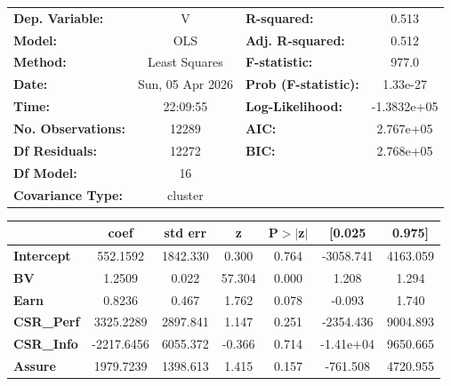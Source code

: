\begin{center}
\begin{tabular}{lclc}
\toprule
\textbf{Dep. Variable:}    &        V         & \textbf{  R-squared:         } &       0.513     \\
\textbf{Model:}            &       OLS        & \textbf{  Adj. R-squared:    } &       0.512     \\
\textbf{Method:}           &  Least Squares   & \textbf{  F-statistic:       } &       977.0     \\
\textbf{Date:}             & Sun, 05 Apr 2026 & \textbf{  Prob (F-statistic):} &    1.33e-27     \\
\textbf{Time:}             &     22:09:55     & \textbf{  Log-Likelihood:    } &  -1.3832e+05    \\
\textbf{No. Observations:} &       12289      & \textbf{  AIC:               } &   2.767e+05     \\
\textbf{Df Residuals:}     &       12272      & \textbf{  BIC:               } &   2.768e+05     \\
\textbf{Df Model:}         &          16      & \textbf{                     } &                 \\
\textbf{Covariance Type:}  &     cluster      & \textbf{                     } &                 \\
\bottomrule
\end{tabular}
\begin{tabular}{lcccccc}
                   & \textbf{coef} & \textbf{std err} & \textbf{z} & \textbf{P$> |$z$|$} & \textbf{[0.025} & \textbf{0.975]}  \\
\midrule
\textbf{Intercept} &     552.1592  &     1842.330     &     0.300  &         0.764        &    -3058.741    &     4163.059     \\
\textbf{BV}        &       1.2509  &        0.022     &    57.304  &         0.000        &        1.208    &        1.294     \\
\textbf{Earn}      &       0.8236  &        0.467     &     1.762  &         0.078        &       -0.093    &        1.740     \\
\textbf{CSR\_Perf} &    3325.2289  &     2897.841     &     1.147  &         0.251        &    -2354.436    &     9004.893     \\
\textbf{CSR\_Info} &   -2217.6456  &     6055.372     &    -0.366  &         0.714        &    -1.41e+04    &     9650.665     \\
\textbf{Assure}    &    1979.7239  &     1398.613     &     1.415  &         0.157        &     -761.508    &     4720.955     \\

\end{tabular}
\end{center}
